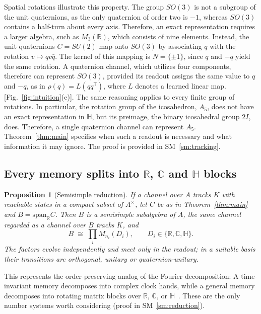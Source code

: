 \documentclass[aps,prx,reprint,superscriptaddress,longbibliography,nofootinbib,floatfix]{revtex4-2}
\newcommand{\HH}{\mathbb{H}}
\newcommand{\CC}{\mathbb{C}}
\newcommand{\RR}{\mathbb{R}}
\theoremstyle{plain}
\newtheorem{proposition}{Proposition}
\theoremstyle{definition}
\begin{document}
Spatial rotations illustrate this property. The group $SO(3)$ is not a subgroup of the unit quaternions, as the only quaternion of order two is $-1$, whereas $SO(3)$
contains a half-turn about every axis. Therefore, an exact representation requires a larger algebra, such as $M_3(\RR)$, which consists of nine elements. Instead, the unit quaternions $C=SU(2)$ map onto $SO(3)$ by associating $q$ with the rotation
$v\mapsto qv\bar q$. The kernel of this mapping is $N=\{\pm1\}$, since $q$
and $-q$ yield the same rotation. A quaternion channel, which utilizes four components, therefore can represent $SO(3)$, provided its readout assigns the same value to $q$ and $-q$, as in $\rho(q)=L(qq^{\mathsf T})$, where $L$ denotes a learned linear map. [Fig.~\ref{fig:intuition}(e)]. The same reasoning applies to every finite group of rotations. In particular, the rotation group of the icosahedron, $A_5$, does not have an exact representation in $\HH$, but its preimage, the binary icosahedral group $2I$, does. Therefore, a single quaternion channel can represent $A_5$. Theorem~\ref{thm:main} specifies when such a readout is necessary and what information it may ignore. The proof is provided in SM~\ref{sm:tracking}.



\subsection{Every memory splits into $\RR$, $\CC$ and $\HH$ blocks}

\begin{proposition}[Semisimple reduction]\label{prop:reduction}
If a channel over $A$ tracks $K$ with reachable states in a compact subset
of $A^\times$, let $C$ be as in Theorem~\ref{thm:main} and
$B=\mathrm{span}_\RR C$. Then $B$ is a semisimple subalgebra of $A$, the
same channel regarded as a channel over $B$ tracks $K$, and
\begin{equation}
B\;\cong\;\prod_i M_{n_i}(D_i),\qquad D_i\in\{\RR,\CC,\HH\}.
\label{eq:wedderburn}
\end{equation}
The factors evolve independently and meet only in the readout; in a
suitable basis their transitions are orthogonal, unitary or
quaternion-unitary.
\end{proposition}

This represents the order-preserving analog of the Fourier decomposition:
A time-invariant memory decomposes into complex clock hands, while a general memory decomposes into rotating matrix blocks over $\RR$, $\CC$, or $\HH$~\cite{broecker,lam}. These are the only number systems worth considering (proof in SM~\ref{sm:reduction}).
\end{document}
